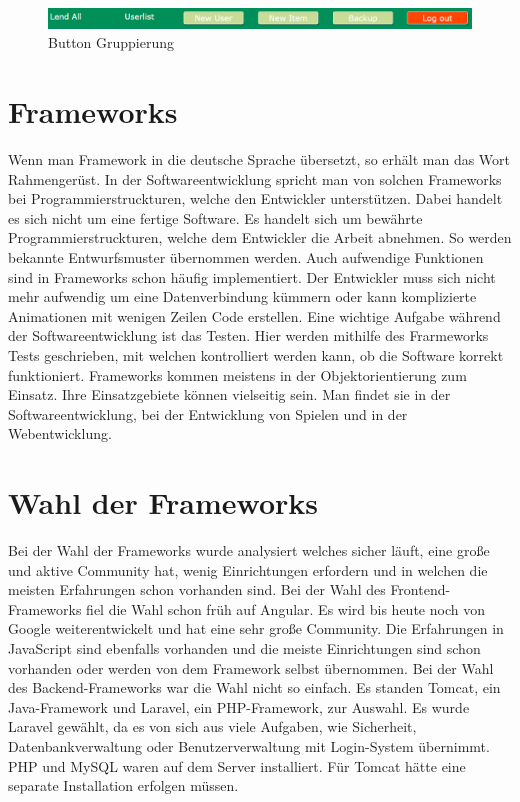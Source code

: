 \begin{figure}[bh]
	\centering
	\includegraphics[scale=0.3]{content/pictures/gruppierung.png}
	\caption{Button Gruppierung}
	\label{fig:gruppierung}
\end{figure}


\section{Frameworks}
Wenn man Framework in die deutsche Sprache übersetzt, so erhält man das Wort Rahmengerüst. In der Softwareentwicklung spricht man von solchen Frameworks bei Programmierstruckturen, welche den Entwickler unterstützen. Dabei handelt es sich nicht um eine fertige Software. Es handelt sich um bewährte Programmierstruckturen, welche dem Entwickler die Arbeit abnehmen. So werden bekannte Entwurfsmuster übernommen werden. Auch aufwendige Funktionen sind in Frameworks schon häufig implementiert. Der Entwickler muss sich nicht mehr aufwendig um eine Datenverbindung kümmern oder kann komplizierte Animationen mit wenigen Zeilen Code erstellen. Eine wichtige Aufgabe während der Softwareentwicklung ist das Testen. Hier werden mithilfe des Frarmeworks Tests geschrieben, mit welchen kontrolliert werden kann, ob die Software korrekt funktioniert. Frameworks kommen meistens in der Objektorientierung zum Einsatz. Ihre Einsatzgebiete können vielseitig sein. Man findet sie in der Softwareentwicklung, bei der Entwicklung von Spielen und in der Webentwicklung.

\section{Wahl der Frameworks}
Bei der Wahl der Frameworks wurde analysiert welches sicher läuft, eine große und aktive Community hat, wenig Einrichtungen erfordern und in welchen die meisten Erfahrungen schon vorhanden sind. Bei der Wahl des Frontend-Frameworks fiel die Wahl schon früh auf Angular. Es wird bis heute noch von Google weiterentwickelt und hat eine sehr große Community. Die Erfahrungen in JavaScript sind ebenfalls vorhanden und die meiste Einrichtungen sind schon vorhanden oder werden von dem Framework selbst übernommen. Bei der Wahl des Backend-Frameworks war die Wahl nicht so einfach. Es standen Tomcat, ein Java-Framework und Laravel, ein \acs{PHP}-Framework, zur Auswahl. Es wurde Laravel gewählt, da es von sich aus viele Aufgaben, wie Sicherheit, Datenbankverwaltung oder Benutzerverwaltung mit Login-System übernimmt. \acs{PHP} und MySQL waren auf dem Server installiert. Für Tomcat hätte eine separate Installation erfolgen müssen.
